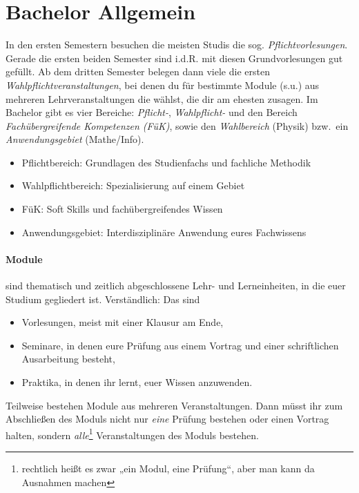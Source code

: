 \section{Bachelor Allgemein}
In den ersten Semestern besuchen die meisten Studis die sog. \emph{Pflichtvorlesungen}. Gerade die ersten beiden Semester sind i.d.R. mit diesen Grundvorlesungen gut gefüllt. Ab dem dritten Semester belegen dann viele die ersten \emph{Wahlpflichtveranstaltungen}, bei denen du für bestimmte Module (s.u.) aus mehreren Lehrveranstaltungen die wählst, die dir am ehesten zusagen. Im Bachelor gibt es vier Bereiche: \emph{Pflicht-}, \emph{Wahlpflicht-} und den Bereich \emph{Fachübergreifende Kompetenzen (FüK)}, sowie den \emph{Wahlbereich} (Physik) bzw.~ein \emph{Anwendungsgebiet} (Mathe/Info).

\begin{itemize}
	\item Pflichtbereich: Grundlagen des Studienfachs und fachliche Methodik
	\item Wahlpflichtbereich: Spezialisierung auf einem Gebiet
	\item FüK: Soft Skills und fachübergreifendes Wissen
	\item Anwendungsgebiet: Interdisziplinäre Anwendung eures Fachwissens
\end{itemize}

\paragraph*{Module} sind \glqq{}thematisch und zeitlich abgeschlossene Lehr- und Lerneinheiten\grqq{}, in die euer Studium gegliedert ist. Verständlich: Das sind

\begin{itemize}
	\item Vorlesungen, meist mit einer Klausur am Ende,
	\item Seminare, in denen eure Prüfung aus einem Vortrag und einer schriftlichen Ausarbeitung besteht,
	\item Praktika, in denen ihr lernt, euer Wissen anzuwenden.
\end{itemize}

Teilweise bestehen Module aus mehreren Veranstaltungen. Dann müsst ihr zum Abschließen des Moduls nicht nur \textit{eine} Prüfung bestehen oder einen Vortrag halten, sondern \textit{alle}\footnote{rechtlich heißt es zwar „ein Modul, eine Prüfung“, aber man kann da Ausnahmen machen} Veranstaltungen des Moduls bestehen.

